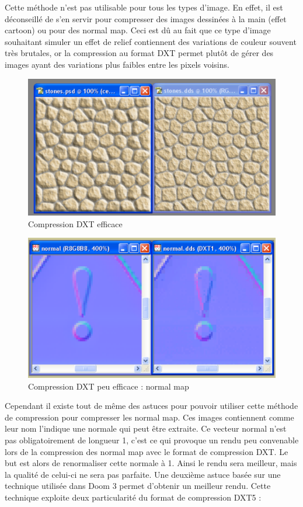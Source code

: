 \documentclass[a4paper, 12pt]{article} %
\begin{document}
Cette méthode n'est pas utilisable pour tous les types d'image. En effet, il est déconseillé de s'en servir pour compresser des images dessinées à la main (effet cartoon) ou pour des normal map. Ceci est dû au fait que ce type d'image souhaitant simuler un effet de relief contiennent des variations de couleur souvent très brutales, or la compression au format DXT permet plutôt de gérer des images ayant des variations plus faibles entre les pixels voisins.


\begin{figure}[!h]%
	\begin{center}
	\includegraphics[width=0.60\columnwidth]{images/dxt_compression_1.png}%
	\caption{Compression DXT efficace}%
	\label{}%
	\end{center}
\end{figure}

\begin{figure}[!h]%
	\begin{center}
	\includegraphics[width=0.60\columnwidth]{images/dxt_compression_2.png}%
	\caption{Compression DXT peu efficace : normal map}%
	\label{}%
	\end{center}
\end{figure}

Cependant il existe tout de même des astuces pour pouvoir utiliser cette méthode de compression pour compresser les normal map. Ces images contiennent comme leur nom l'indique une normale qui peut être extraite. Ce vecteur normal n'est pas obligatoirement de longueur 1, c'est ce qui provoque un rendu peu convenable lors de la compression des normal map avec le format de compression DXT. Le but est alors de renormaliser cette normale à 1. Ainsi le rendu sera meilleur, mais la qualité de celui-ci ne sera pas parfaite. Une deuxième astuce basée sur une technique utilisée dans Doom 3 permet d'obtenir un meilleur rendu. Cette technique exploite deux particularité du format de compression DXT5 :
\end{document}
